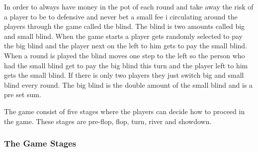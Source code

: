 \documentclass[journal]{vgtc}                %
\begin{document}
In order to always have money in the pot of each round and take away the risk of a player to be to defensive and never bet a small fee i circulating around the players through the game called the blind. The blind is two amounts called big and small blind. When the game starts a player gets randomly selected to pay the big blind and the player next on the left to him gets to pay the small blind. When a round  is played the blind moves one step to the left so the person who had the small blind get to pay the big blind this turn and the player left to him gets the small blind. If there is only two players they just switch big and small blind every round. The big blind is the double amount of the small blind and is a pre set sum.

The game consist of five stages where the players can decide how to proceed in the game.
These stages are pre-flop, flop, turn, river and showdown.

\subsubsection{The Game Stages}
\end{document}
